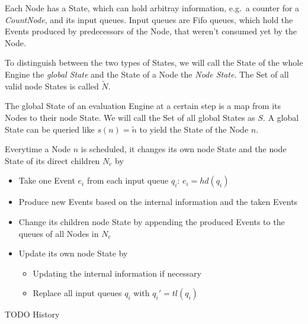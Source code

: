 Each Node has a State, which can hold arbitray information, e.g.\ a counter for a \emph{CountNode}, and its input queues.
Input queues are Fifo queues, which hold the Events produced by predecessors of the Node, that weren't consumed yet by the Node.

To distinguish between the two types of States, we will call the State of the whole Engine the \emph{global State} and the State of a Node the \emph{Node State}.
The Set of all valid node States is called \(\widetilde{N}\).


The global State of an evaluation Engine at a certain step is a map from its Nodes to their node State.
We will call the Set of all global States as \(S\).
A global State can be queried like \(s(n) = \widetilde{n}\) to yield the State of the Node \(n\).

Everytime a Node \(n\) is scheduled, it changes its own node State and the node State of its direct children \(N_c\) by

\begin{itemize}
  \item Take one Event \(e_i\) from each input queue \(q_i\): \(e_i = hd(q_i)\)
  \item Produce new Events based on the internal information and the taken Events
  \item Change its children node State by appending the produced Events to the queues of all Nodes in \(N_c\)
  \item Update its own node State by
  \begin{itemize}
    \item Updating the internal information if necessary
    \item Replace all input queues \(q_i\) with \(q_i' = tl(q_i)\)
  \end{itemize}
\end{itemize}

TODO History

